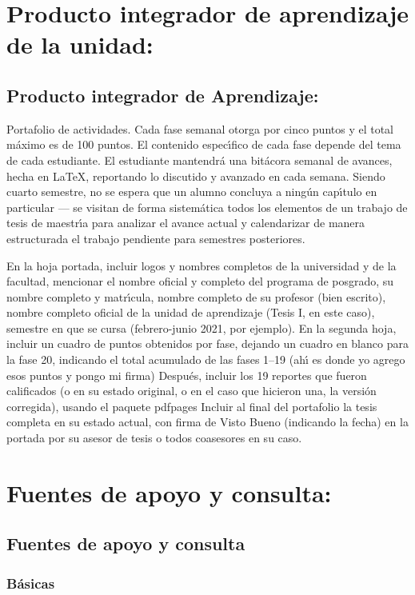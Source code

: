 \documentclass[10 pt]{article}
\begin{document}
  \newpage

\section{Producto integrador de aprendizaje de la unidad:}
\subsection{Producto integrador de Aprendizaje:} 

Portafolio de actividades. Cada fase semanal otorga por cinco puntos y
el total m\'{a}ximo es de 100 puntos. El contenido espec\'{\i}fico de
cada fase depende del tema de cada estudiante. El estudiante
mantendr\'{a} una bit\'{a}cora semanal de avances, hecha en \LaTeX,
reportando lo discutido y avanzado en cada semana. Siendo cuarto
semestre, no se espera que un alumno concluya a ning\'{u}n
cap\'{\i}tulo en particular --- se visitan de forma sistem\'{a}tica
todos los elementos de un trabajo de tesis de maestr\'{\i}a para analizar
el avance actual y calendarizar de manera estructurada el trabajo
pendiente para semestres posteriores.

En la hoja portada, incluir logos y nombres completos de la
universidad y de la facultad, mencionar el nombre oficial y completo
del programa de posgrado, su nombre completo y matr\'{\i}cula, nombre
completo de su profesor (bien escrito), nombre completo oficial de la
unidad de aprendizaje (Tesis I, en este caso), semestre en que se
cursa (febrero-junio 2021, por ejemplo). En la segunda hoja, incluir
un cuadro de puntos obtenidos por fase, dejando un cuadro en blanco
para la fase 20, indicando el total acumulado de las fases 1--19 (ah\'{\i}
es donde yo agrego esos puntos y pongo mi firma) Despu\'{e}s, incluir los
19 reportes que fueron calificados (o en su estado original, o en el
caso que hicieron una, la versi\'{o}n corregida), usando el paquete
pdfpages Incluir al final del portafolio la tesis completa en su
estado actual, con firma de Visto Bueno (indicando la fecha) en la
portada por su asesor de tesis o todos coasesores en su caso.

\section{Fuentes de apoyo y consulta:}
\subsection{Fuentes de apoyo y consulta}
\subsubsection{B\'{a}sicas}
\end{document}
